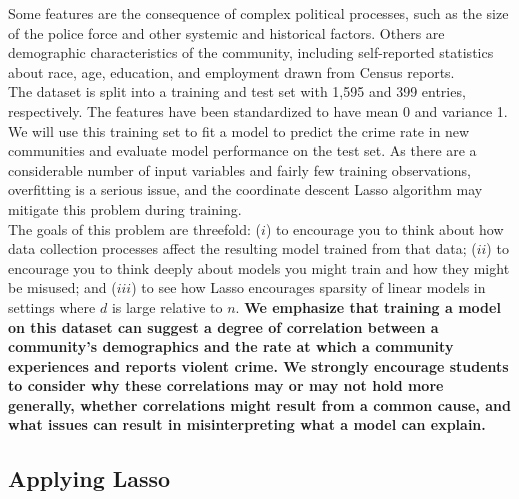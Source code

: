 \documentclass{article}
\begin{document}
    Some features are the consequence of complex political processes, such as the size of the police force and other systemic and historical factors. Others are demographic
    characteristics of the community, including self-reported statistics about race, age, education, and employment drawn from Census reports.\\

    The dataset is split into a training and test set with 1,595 and 399 entries, respectively. The features have been standardized to have mean 0 and variance 1. 
    We will use this training set to fit a model to predict the crime rate in new communities and evaluate model performance on the test set.  As there are a considerable number of input variables and fairly few training observations, overfitting is a serious issue, and the coordinate descent Lasso algorithm may mitigate this problem during training. \\
    
    The goals of this problem are threefold: ($i$) to encourage you to think about how data collection processes affect the resulting model trained from that data; ($ii$) to encourage you to think deeply about models you might train and how they might be misused; and ($iii$) to see how Lasso encourages sparsity of linear models in settings where $d$ is large relative to $n$. \textbf{We emphasize that training a model on this dataset can suggest a degree of correlation between a community's demographics and the rate at which a community experiences and reports violent crime. We strongly encourage students to consider why these correlations may or may not hold more generally, whether correlations might result from a common cause, and what issues can result in misinterpreting what a model can explain.}\\
    
\subsection*{Applying Lasso}
\end{document}
